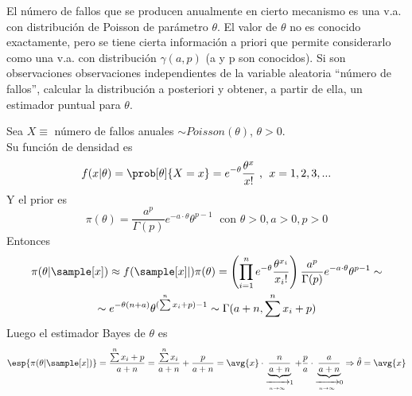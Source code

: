 \pagebreak
\begin{problem}[10]
El número de fallos que se producen anualmente en cierto mecanismo es una v.a. con distribución de Poisson de parámetro $\theta$. El valor de $\theta$ no es conocido exactamente, pero se tiene cierta información a priori que permite considerarlo como una v.a. con distribución $\gamma(a, p)$ (a y p son conocidos). Si \sample[x] son observaciones observaciones independientes de la variable aleatoria ``número de fallos'', calcular la distribución a posteriori y obtener, a partir de ella, un estimador puntual para $\theta$.
\solution

Sea $X \equiv$ número de fallos anuales $\sim Poisson(\theta)$, $\theta > 0$.\\
Su función de densidad es
\[
f(x \vert \theta) =
\prob[\theta]{X = x} =
e^{- \theta} \frac{\theta^x}{x!} \text{ , } \; x = 1, 2, 3, ...
\]
Y el prior es
\[
\pi(\theta) =
\frac{a^p}{\Gamma(p)} e^{-a \cdot \theta} \theta ^{p - 1} \; \text{ con } \theta > 0, a > 0, p > 0
\]
Entonces
\begin{gather*}
\pi(\theta \vert \sample[x]) \approx
f(\sample[x] \vert) \pi(\theta) =
\left( \prod\limits^n_{i = 1} e^{-\theta} \frac{\theta^{x_i}}{x_i !} \right) \frac{a^p}{\Gamma(p)} e^{-a \cdot \theta} \theta ^{p - 1} \sim\\
\sim e^{- \theta (n + a)} \theta^{(\sum\limits^n x_i + p) - 1} \sim
\Gamma(a + n, \sum\limits^n x_i + p)
\end{gather*}
Luego el estimador Bayes de $\theta$ es
\[
\esp{\pi(\theta \vert \sample[x])} =
\frac{\sum\limits^n x_i + p}{a + n} =
\frac{\sum\limits^n x_i}{a + n} + \frac{p}{a + n} =
\avg{x} \cdot \underbrace{\frac{n}{a + n}}_{\xrightarrow[n \to \infty]{} 1} + \frac{p}{a} \cdot \underbrace{\frac{a}{a + n}}_{\xrightarrow[n \to \infty]{} 0}
\Rightarrow \hat\theta = \avg{x}
\]

\end{problem}


